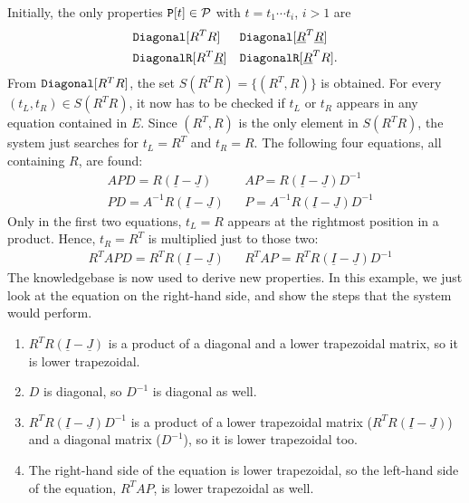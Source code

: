 Initially, the only properties $\text{\ttfamily P}[t] \in \mathcal{P}$ with $t = t_1 \cdots t_i$, $i > 1$ are
%
\begin{align*}
&\text{\ttfamily Diagonal}[R^T R] &&\text{\ttfamily Diagonal}[\underline{R}^T \underline{R}]\\
&\text{\ttfamily DiagonalR}[R^T \underline{R}] && \text{\ttfamily DiagonalR}[\underline{R}^T R] \text{.}
\end{align*}
%
From $\text{\ttfamily Diagonal}[R^T R]$, the set $S(R^T R) = \{(R^T, R)\}$ is obtained. For every $(t_L, t_R) \in S(R^T R)$, it now has to be checked if $t_L$ or $t_R$ appears in any equation contained in $E$. Since $(R^T, R)$ is the only element in $S(R^T R)$, the system just searches for $t_L = R^T$ and $t_R = R$. The following four equations, all containing $R$, are found:
%
\begin{align*}
&APD = R \left( \underline{I} - \underline{J} \right) &&AP = R \left( \underline{I} - \underline{J} \right)D^{-1} \\
	&PD = A^{-1}R \left( \underline{I} - \underline{J} \right) &&P = A^{-1} R \left( \underline{I} - \underline{J} \right) D^{-1}
\end{align*}
%
Only in the first two equations, $t_L = R$ appears at the rightmost position in a product. Hence, $t_R = R^T$ is multiplied just to those two:
%
\begin{align*}
&R^TAPD = R^TR \left( \underline{I} - \underline{J}  \right) &&R^TAP = R^TR \left( \underline{I} - \underline{J}  \right)D^{-1}
\end{align*}
%
The knowledgebase is now used to derive new properties. In this example, we just look at the equation on the right-hand side, and show the steps that the system would perform.
%
\begin{enumerate}
\item $R^TR \left( \underline{I} - \underline{J}  \right)$ is a product of a diagonal and a lower trapezoidal matrix, so it is lower trapezoidal.
\item $D$ is diagonal, so $D^{-1}$ is diagonal as well.
\item $R^TR \left( \underline{I} - \underline{J}  \right)D^{-1}$ is a product of a lower trapezoidal matrix ($R^TR \left( \underline{I} - \underline{J}  \right)$) and a diagonal matrix ($D^{-1}$), so it is lower trapezoidal too.
\item The right-hand side of the equation is lower trapezoidal, so the left-hand side of the equation, $R^TAP$, is lower trapezoidal as well.
\end{enumerate}
